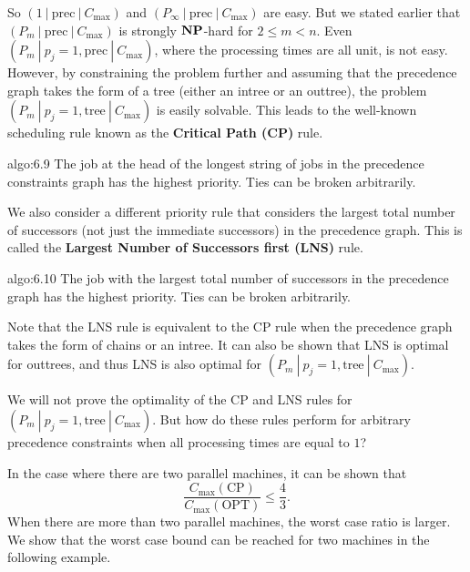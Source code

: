 So $(1~|~\text{prec}~|~C_{\max})$ and $(P_\infty~|~\text{prec}~|~C_{\max})$
are easy. But we stated earlier that $(P_m~|~\text{prec}~|~C_{\max})$ is 
strongly $\operatorname{\textbf{NP}}$-hard for $2 \leq m < n$. Even $(P_m~|~p_j = 1, \text{prec}~|~C_{\max})$,
where the processing times are all unit, is not easy. However, by constraining 
the problem further and assuming that the precedence graph takes the form 
of a tree (either an intree or an outtree), the problem $(P_m~|~p_j = 1, 
\text{tree}~|~C_{\max})$ is easily solvable. This leads to the well-known 
scheduling rule known as the {\bf Critical Path (CP)} rule. 

\begin{algo}{algo:6.9}
    The job at the head of the longest string of jobs in the precedence
    constraints graph has the highest priority. Ties can be broken arbitrarily.
\end{algo}

We also consider a different priority rule that considers the largest 
total number of successors (not just the immediate successors) in the 
precedence graph. This is called the {\bf Largest Number of Successors first 
(LNS)} rule. 

\begin{algo}{algo:6.10}
    The job with the largest total number of successors in the 
    precedence graph has the highest priority. Ties can be broken arbitrarily.
\end{algo}

Note that the LNS rule is equivalent to the CP rule when the precedence 
graph takes the form of chains or an intree. It can also be shown that 
LNS is optimal for outtrees, and thus LNS is also optimal for 
$(P_m~|~p_j = 1, \text{tree}~|~C_{\max})$.

We will not prove the optimality of the CP and LNS rules for 
$(P_m~|~p_j = 1, \text{tree}~|~C_{\max})$. But how do these rules perform for 
arbitrary precedence constraints when all processing times are equal to $1$? 

In the case where there are two parallel machines, it can be shown that 
\[ \frac{C_{\max}(\text{CP})}{C_{\max}(\text{OPT})} \leq \frac43. \] 
When there are more than two parallel machines, the worst case ratio is larger. 
We show that the worst case bound can be reached for two machines in the 
following example. 

